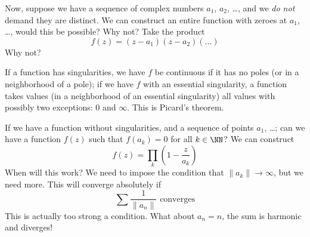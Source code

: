 Now, suppose we have a sequence of complex numbers $a_{1}$,
$a_{2}$, \dots, and we \emph{do not} demand they are distinct. We
can construct an entire function with zeroes at $a_{1}$, \dots,
would this be possible? Why not? Take the product
\begin{equation}
f(z)=(z-a_{1})(z-a_{2})(\dots)
\end{equation}
Why not?

\begin{rmk}
If a function has singularities, we have $f$ be continuous if it
has no poles (or in a neighborhood of a pole); if we have $f$
with an essential singularity, a function takes values (in a
neighborhood of an essential singularity) all values with
possibly two exceptions: 0 and $\infty$. This is Picard's theorem.
\end{rmk}

If we have a function without singularities, and a sequence of
points $a_{1}$, \dots; can we have a function $f(z)$ such that
$f(a_{k})=0$ for all $k\in\NN$? We can construct
\begin{equation}
f(z)=\prod_{k}\left(1-\frac{z}{a_{k}}\right)
\end{equation}
When will this work? We need to impose the condition that
$\|a_{k}\|\to\infty$, but we need more. This will converge
absolutely if
\begin{equation}
\sum\frac{1}{\|a_{n}\|}\mbox{ converges}
\end{equation}
This is actually too strong a condition. What about $a_{n}=n$,
the sum is harmonic and diverges!

